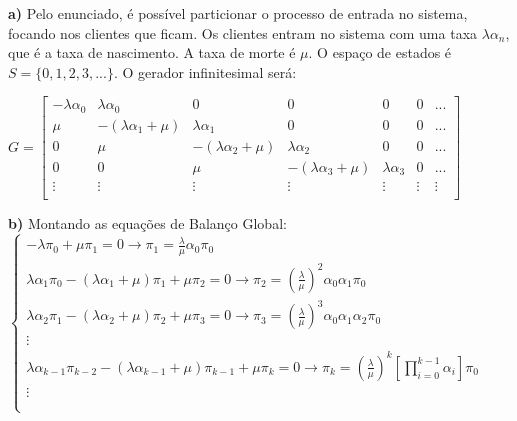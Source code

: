 \documentclass[12pt]{article}
\begin{document}
	\textbf{a)} Pelo enunciado, é possível particionar o processo de entrada no sistema, focando nos clientes que ficam. Os clientes entram no sistema com uma taxa $ \lambda \alpha_n $, que é a taxa de nascimento. A taxa de morte é $ \mu $. O espaço de estados é $ S=\{0, 1, 2, 3, ...\} $. O gerador infinitesimal será:
	
	\begin{center}
		$
		G = \left[\begin{array}{ccccccc}
			-\lambda \alpha_0  & \lambda \alpha_0         & 0                        & 0                       & 0                & 0      & ...    \\
			\mu                &  -(\lambda \alpha_1+\mu) & \lambda \alpha_1         & 0                       & 0                & 0      & ...    \\
			0                  & \mu                      &  -(\lambda \alpha_2+\mu) & \lambda \alpha_2        & 0                & 0      & ...    \\
			0                  & 0                        & \mu                      & -(\lambda \alpha_3+\mu) & \lambda \alpha_3 & 0      & ...    \\ 
			\vdots             & \vdots                   & \vdots                   & \vdots                  & \vdots           & \vdots & \vdots \\
		\end{array}\right]
	$
	\end{center}
	
	\textbf{b)} Montando as equações de Balanço Global: \\ 
	
	$ \begin{cases}
	-\lambda \pi_0 + \mu \pi_1 = 0 \to \pi_1 = \frac{\lambda}{\mu} \alpha_0 \pi_0\\
	\lambda \alpha_1\pi_0 -(\lambda\alpha_1+\mu) \pi_1 + \mu \pi_2 = 0 \to \pi_2 = \left(\frac{\lambda}{\mu}\right)^2 \alpha_0 \alpha_1 \pi_0\\
	\lambda \alpha_2 \pi_1 -(\lambda\alpha_2+\mu) \pi_2 + \mu \pi_3 = 0 \to \pi_3 = \left(\frac{\lambda}{\mu}\right)^3 \alpha_0 \alpha_1 \alpha_2 \pi_0\\
	\vdots \\
	\lambda \alpha_{k-1} \pi_{k-2} -(\lambda\alpha_{k-1}+\mu) \pi_{k-1} + \mu \pi_k = 0 \to \pi_k = \left(\frac{\lambda}{\mu}\right)^k \left[\prod_{i=0}^{k-1} \alpha_{i}\right] \pi_0\\
	\vdots \\ \\
	\end{cases} $
	
\end{document}
